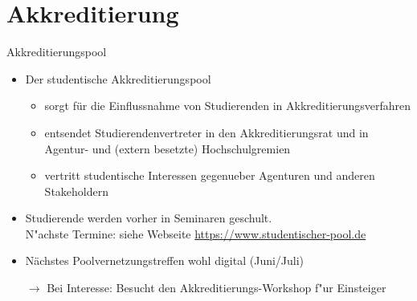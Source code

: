 \documentclass[compress, aspectratio=169]{beamer}
\begin{document}


\section{Akkreditierung}

\begin{frame}{Akkreditierungspool}
    \begin{itemize}
        \item Der studentische Akkreditierungspool
        \begin{itemize}
        	\item sorgt für die Einflussnahme von Studierenden in Akkreditierungsverfahren
        	\item entsendet Studierendenvertreter in den Akkreditierungsrat und in Agentur- und (extern besetzte) Hochschulgremien
        	\item vertritt studentische Interessen gegenueber Agenturen und anderen Stakeholdern
        \end{itemize}         
        \item Studierende werden vorher in Seminaren geschult. \\
          {\scriptsize\color{blue} N"achste Termine: siehe Webseite \url{https://www.studentischer-pool.de}}
        \item Nächstes Poolvernetzungstreffen wohl digital {\color{blue} (Juni/Juli)}
        \vspace{0.5cm}
        \item[$\rightarrow$] Bei Interesse: Besucht den Akkreditierungs-Workshop f"ur Einsteiger
    \end{itemize}
\end{frame}

\end{document}

